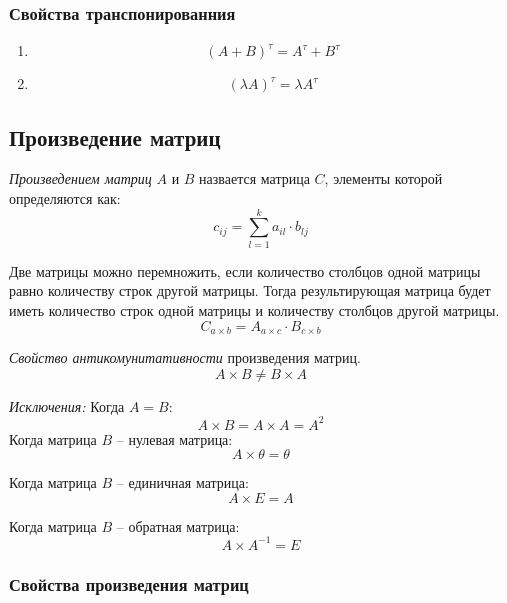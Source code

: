 \subsubsection{Свойства транспонированния}

\begin{enumerate}
  \item \[
      (A + B)^\tau = A^\tau + B^\tau
  \] 

  \item \[
    (\lambda A)^\tau = \lambda A^\tau
\] 
\end{enumerate}

\subsection{Произведение матриц}

\begin{definition}
  \textit{Произведением матриц} $A$ и $B$ назвается матрица $C$, элементы которой определяются как: \[
    c_{ij} = \sum_{l=1}^{k} a_{il} \cdot b_{lj}
  \] 
\end{definition}

\begin{note}
  Две матрицы можно перемножить, если количество столбцов одной матрицы равно количеству строк другой матрицы. Тогда результирующая матрица будет иметь количество строк одной матрицы и количеству столбцов другой матрицы. \[
    C_{a \times b} = A_{a \times c} \cdot B_{c \times b}
  \] 
\end{note}

\textit{Свойство антикомунитативности} произведения матриц. 
\[
  A \times B \neq B \times A
\]

\begin{note}
  \textit{Исключения:} 
  Когда $A = B$:  \[
    A \times B = A \times A = A^2
  \]  
  Когда матрица $B$ -- нулевая матрица:
  \[
    A \times \theta = \theta
  \] 

  Когда матрица  $B$ -- единичная матрица:
  \[
    A \times E = A
  \] 

  Когда матрица $B$ -- обратная матрица:
  \[
    A \times A^{-1} = E
  \] 
\end{note}

\subsubsection{Свойства произведения матриц}


